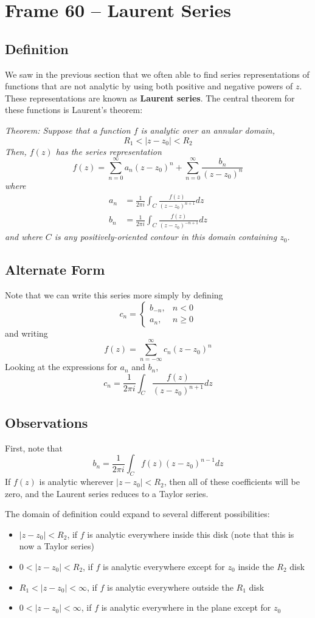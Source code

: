 \documentclass{article}
\renewcommand{\emph}{\textbf}
\begin{document}
\clearpage
\section{Frame 60 -- Laurent Series}
\subsection{Definition}
We saw in the previous section that we often able to find series representations of functions that are not analytic by using both positive and negative powers of $z$. These representations are known as \emph{Laurent series}. The central theorem for these functions is Laurent's theorem:

\textit{Theorem: Suppose that a function $f$ is analytic over an annular domain,
\[
	R_1 < |z - z_0| < R_2
\]
Then, $f(z)$ has the series representation
\[
	f(z) 
	= \sum_{n=0}^\infty a_n (z - z_0)^n
	+ \sum_{n=0}^\infty \frac{b_n}{(z - z_0)^n}
\]
where
\begin{align*}
	a_n &= \frac{1}{2\pi i} \int_C \frac{f(z)}{(z - z_0)^{ n+1}} dz \\
	b_n &= \frac{1}{2\pi i} \int_C \frac{f(z)}{(z - z_0)^{-n+1}} dz
\end{align*}
and where $C$ is any positively-oriented contour in this domain containing $z_0$.}

\subsection{Alternate Form}
Note that we can write this series more simply by defining
\[
	c_n = 
	\begin{cases}
		b_{-n},	& n < 0 \\
		a_n,	& n \ge 0
	\end{cases}
\]
and writing
\[
	f(z) = \sum_{n=-\infty}^\infty c_n (z - z_0)^n
\]
Looking at the expressions for $a_n$ and $b_n$,
\[
	c_n = \frac{1}{2\pi i} \int_C \frac{f(z)}{(z - z_0)^{n+1}} dz
\]

\subsection{Observations}
First, note that
\[
	b_n = \frac{1}{2\pi i} \int_C f(z) (z - z_0)^{n-1} dz
\]
If $f(z)$ is analytic wherever $|z - z_0| < R_2$, then all of these coefficients will be zero, and the Laurent series reduces to a Taylor series. 

The domain of definition could expand to several different possibilities:
\begin{itemize}
	\item $|z - z_0| < R_2$, if $f$ is analytic everywhere inside this disk (note that this is now a Taylor series)
	
	\item $0 < |z - z_0| < R_2$, if $f$ is analytic everywhere except for $z_0$ inside the $R_2$ disk
	
	\item $R_1 < |z - z_0| < \infty$, if $f$ is analytic everywhere outside the $R_1$ disk
	
	\item $0 < |z - z_0| < \infty$, if $f$ is analytic everywhere in the plane except for $z_0$
\end{itemize}
\end{document}
